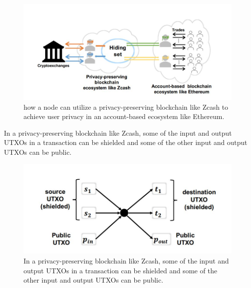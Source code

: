 \begin{center}
	\begin{figure}
		\centering
		\includegraphics[width=0.8\linewidth]{Fig/20/F5}
		\caption{
			how a node can utilize a privacy-preserving blockchain like Zcash to achieve user privacy in an account-based ecosystem like Ethereum.
		}
		\label{fig:L20_f5}
	\end{figure}
\end{center}
In a privacy-preserving blockchain like Zcash, some of the input and output UTXOs in a  transaction can be shielded and some of the other input and output UTXOs can be public.
\begin{center}
	\begin{figure}
		\centering
		\includegraphics[width=0.8\linewidth]{Fig/20/F6}
		\caption{
			In a privacy-preserving blockchain like Zcash, some of the input and output UTXOs in a  transaction can be shielded and some of the other input and output UTXOs can be public.
		}
		\label{fig:L20_f6}
	\end{figure}
\end{center}
